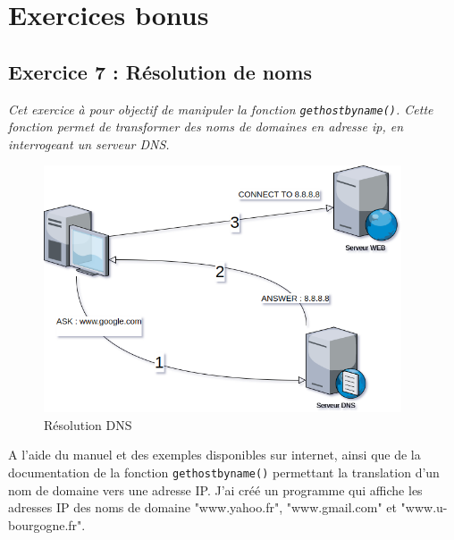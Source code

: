 \section{Exercices bonus}

\subsection{Exercice 7 : Résolution de noms}
\textit{Cet exercice à pour objectif de manipuler la fonction \texttt{gethostbyname()}. Cette fonction permet de transformer des noms de domaines en adresse ip, en interrogeant un serveur DNS.}

\begin{figure}[H]
\centering
\includegraphics[width=300pt]{./cpp/Pictures/tp7+tp8-DNS}
\caption{Résolution DNS}
\label{Résolution DNS}
\end{figure}

A l’aide du manuel et des exemples disponibles sur internet, ainsi que de la documentation de la fonction \texttt{gethostbyname()} permettant la translation d’un nom de domaine vers une adresse IP. J'ai créé un programme qui affiche les adresses IP des noms de domaine "www.yahoo.fr", "www.gmail.com" et "www.u-bourgogne.fr".

\inputminted[linenos,firstline=10, lastline=36]{cpp}{../sources/cpp/TP7-8/getHostByName.c}

